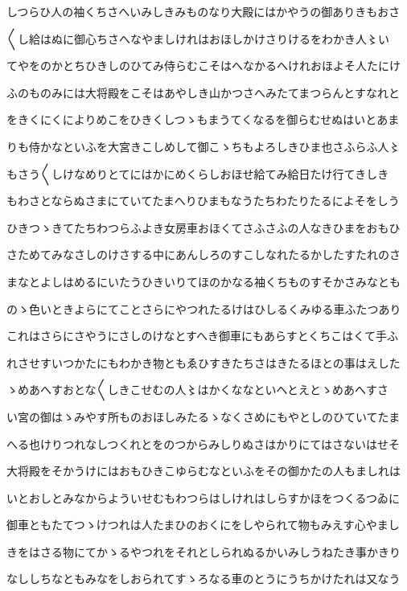 \documentclass[a4paper,11pt,landscape]{ltjtarticle}
\begin{document}
しつらひ人の袖くちさへいみしきみものなり大殿にはかやうの御ありきもおさ
\par\medskip
〱し給はぬに御心ちさへなやましけれはおほしかけさりけるをわかき人〻い
\par\medskip
てやをのかとちひきしのひてみ侍らむこそはへなかるへけれおほよそ人たにけ
\par\medskip
ふのものみには大将殿をこそはあやしき山かつさへみたてまつらんとすなれと
\par\medskip
をきくにくによりめこをひきくしつゝもまうてくなるを御らむせぬはいとあま
\par\medskip
りも侍かなといふを大宮きこしめして御こゝちもよろしきひま也さふらふ人〻
\par\medskip
もさう〱しけなめりとてにはかにめくらしおほせ給てみ給日たけ行てきしき
\par\medskip
もわさとならぬさまにていてたまへりひまもなうたちわたりたるによそをしう
\par\medskip
ひきつゝきてたちわつらふよき女房車おほくてさふさふの人なきひまをおもひ
\par\medskip
さためてみなさしのけさする中にあんしろのすこしなれたるかしたすたれのさ
\par\medskip
まなとよしはめるにいたうひきいりてほのかなる袖くちものすそかさみなとも
\par\medskip
のゝ色いときよらにてことさらにやつれたるけはひしるくみゆる車ふたつあり
\par\medskip
これはさらにさやうにさしのけなとすへき御車にもあらすとくちこはくて手ふ
\par\medskip
れさせすいつかたにもわかき物ともゑひすきたちさはきたるほとの事はえした
\par\medskip
ゝめあへすおとな〱しきこせむの人〻はかくななといへとえとゝめあへすさ
\par\medskip
い宮の御はゝみやす所ものおほしみたるゝなくさめにもやとしのひていてたま
\par\medskip
へる也けりつれなしつくれとをのつからみしりぬさはかりにてはさないはせそ
\par\medskip
大将殿をそかうけにはおもひきこゆらむなといふをその御かたの人もましれは
\par\medskip
いとおしとみなからよういせむもわつらはしけれはしらすかほをつくるつゐに
\par\medskip
御車ともたてつゝけつれは人たまひのおくにをしやられて物もみえす心やまし
\par\medskip
きをはさる物にてかゝるやつれをそれとしられぬるかいみしうねたき事かきり
\par\medskip
なししちなともみなをしおられてすゝろなる車のとうにうちかけたれは又なう
\end{document}
